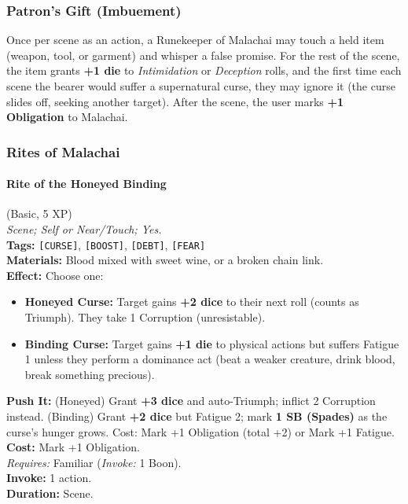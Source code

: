 \subsubsection*{Patron's Gift (Imbuement)}

Once per scene as an action, a Runekeeper of Malachai may touch a held item (weapon, tool, or garment) and whisper a false promise. For the rest of the scene, the item grants \textbf{+1 die} to \textit{Intimidation} or \textit{Deception} rolls, and the first time each scene the bearer would suffer a supernatural curse, they may ignore it (the curse slides off, seeking another target). After the scene, the user marks \textbf{+1 Obligation} to Malachai.

\subsubsection*{Rites of Malachai}

\paragraph{Rite of the Honeyed Binding} (Basic, 5 XP) \hfill \\
\emph{Scene; Self or Near/Touch; Yes.} \\
\textbf{Tags:} \texttt{[CURSE]}, \texttt{[BOOST]}, \texttt{[DEBT]}, \texttt{[FEAR]} \\
\textbf{Materials:} Blood mixed with sweet wine, or a broken chain link. \\
\textbf{Effect:} Choose one:
\begin{itemize}
  \item \textbf{Honeyed Curse:} Target gains \textbf{+2 dice} to their next roll (counts as Triumph). They take 1 Corruption (unresistable).
  \item \textbf{Binding Curse:} Target gains \textbf{+1 die} to physical actions but suffers Fatigue 1 unless they perform a dominance act (beat a weaker creature, drink blood, break something precious).
\end{itemize}
\textbf{Push It:} (Honeyed) Grant \textbf{+3 dice} and auto-Triumph; inflict 2 Corruption instead. (Binding) Grant \textbf{+2 dice} but Fatigue 2; mark \textbf{1 SB (Spades)} as the curse's hunger grows. Cost: Mark +1 Obligation (total +2) or Mark +1 Fatigue. \\
\textbf{Cost:} Mark +1 Obligation. \\
\textit{Requires:} Familiar (\textit{Invoke:} 1 Boon). \\
\textbf{Invoke:} 1 action. \\
\textbf{Duration:} Scene.

